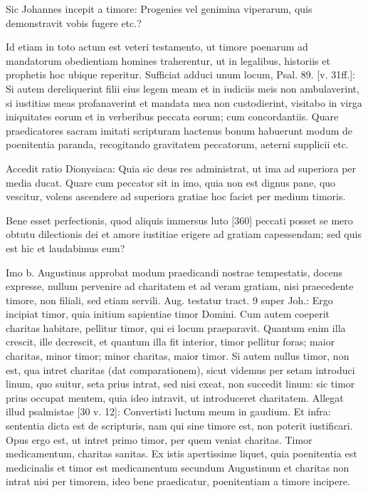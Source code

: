 Sic Johannes incepit a timore: Progenies vel genimina viperarum, quis demonstravit vobis fugere etc.?

Id etiam in toto actum est veteri testamento, ut timore poenarum ad mandatorum obedientiam homines traherentur, ut in legalibus, historiis et prophetis hoc ubique reperitur. Sufficiat adduci unum locum, Psal. 89. [v. 31ff.]: Si autem dereliquerint filii eius legem meam et in iudiciis meis non ambulaverint, si iustitias meas profanaverint et mandata mea non custodierint, visitabo in virga iniquitates eorum et in verberibus peccata eorum; cum concordantiis. Quare praedicatores sacram imitati scripturam hactenus bonum habuerunt modum de poenitentia paranda, recogitando gravitatem peccatorum, aeterni supplicii etc.

Accedit ratio Dionysiaca: Quia sic deus res administrat, ut ima ad superiora per media ducat. Quare cum peccator sit in imo, quia non est dignus pane, quo vescitur, volens ascendere ad superiora gratiae hoc faciet per medium timoris.

Bene esset perfectionis, quod aliquis immersus luto [360] peccati posset se mero obtutu dilectionis dei et amore iustitiae erigere ad gratiam capessendam; sed quis est hic et laudabimus eum?

Imo b. Augustinus approbat modum praedicandi nostrae tempestatis, docens expresse, nullum pervenire ad charitatem et ad veram gratiam, nisi praecedente timore, non filiali, sed etiam servili. Aug. testatur tract. 9 super Joh.: Ergo incipiat timor, quia initium sapientiae timor Domini. Cum autem coeperit charitas habitare, pellitur timor, qui ei locum praeparavit. Quantum enim illa crescit, ille decrescit, et quantum illa fit interior, timor pellitur foras; maior charitas, minor timor; minor charitas, maior timor. Si autem nullus timor, non est, qua intret charitas (dat comparationem), sicut videmus per setam introduci linum, quo suitur, seta prius intrat, sed nisi exeat, non succedit linum: sic timor prius occupat mentem, quia ideo intravit, ut introduceret charitatem. Allegat illud psalmistae [30 v. 12]: Convertisti luctum meum in gaudium. Et infra: sententia dicta est de scripturis, nam qui sine timore est, non poterit iustificari. Opus ergo est, ut intret primo timor, per quem veniat charitas. Timor medicamentum, charitas sanitas. Ex istis apertissime liquet, quia poenitentia est medicinalis et timor est medicamentum secundum Augustinum et charitas non intrat nisi per timorem, ideo bene praedicatur, poenitentiam a timore incipere.

